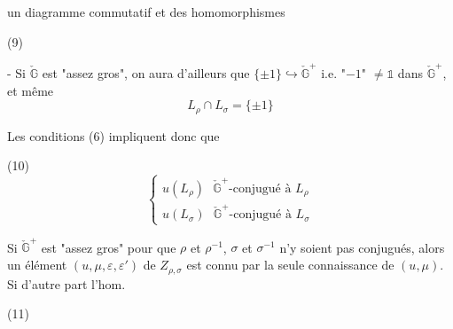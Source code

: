 \begin{enumerate}


\newpage



\newpage



\newpage



\newpage



\newpage


un diagramme commutatif
et des homomorphismes

(9)

- Si $\check{\mathbb{G}}$ est "assez gros", on aura d'ailleurs
que $\{\pm 1\} \hookrightarrow \check{\mathbb{G}}^+$ i.e. "$-1$" $\neq \mathbb{1}$ dans $\check{\mathbb{G}}^+$, et
même
$$L_\rho \cap L_\sigma = \{\pm 1\}$$

Les conditions (6) impliquent donc que

(10)
$$
\begin{cases}
u(L_\rho) \text{ } \check{\mathbb{G}}^+ \text{-conjugué à } L_\rho \\
u(L_\sigma) \text{ } \check{\mathbb{G}}^+ \text{-conjugué à } L_\sigma
\end{cases}
$$

Si $\check{\mathbb{G}}^+$ est "assez gros" pour que $\rho$ et $\rho^{-1}$, $\sigma$ et $\sigma^{-1}$
n'y soient pas conjugués, alors un élément
$(u,\mu,\varepsilon,\varepsilon')$ de $Z_{\rho,\sigma}$ est connu par la seule
connaissance de $(u,\mu)$. Si d'autre part l'hom.

(11)


\end{enumerate}
